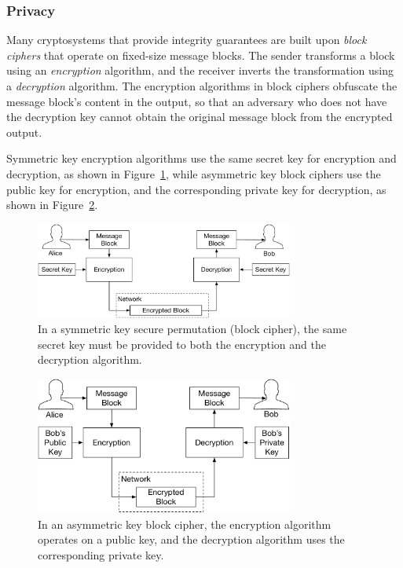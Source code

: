 \subsubsection{Privacy}
\label{sec:privacy_crypto}

Many cryptosystems that provide integrity guarantees are built upon
\textit{block ciphers} that operate on fixed-size message blocks. The sender
transforms a block using an \textit{encryption} algorithm, and the receiver
inverts the transformation using a \textit{decryption} algorithm. The
encryption algorithms in block ciphers obfuscate the message block's content in
the output, so that an adversary who does not have the decryption key cannot
obtain the original message block from the encrypted output.

Symmetric key encryption algorithms use the same secret key for encryption and
decryption, as shown in Figure~\ref{fig:symmetric_block_cipher}, while
asymmetric key block ciphers use the public key for encryption, and the
corresponding private key for decryption, as shown in
Figure~\ref{fig:asymmetric_block_cipher}.
\begin{figure}[hbt]
  \centering
  \includegraphics[width=85mm]{figures/symmetric_block_cipher.pdf}
  \caption{
    In a symmetric key secure permutation (block cipher), the same secret key
    must be provided to both the encryption and the decryption algorithm.
  }
  \label{fig:symmetric_block_cipher}
\end{figure}

\begin{figure}[hbt]
  \centering
  \includegraphics[width=85mm]{figures/asymmetric_block_cipher.pdf}
  \caption{
    In an asymmetric key block cipher, the encryption algorithm operates on a
    public key, and the decryption algorithm uses the corresponding private
    key.
  }
  \label{fig:asymmetric_block_cipher}
\end{figure}

